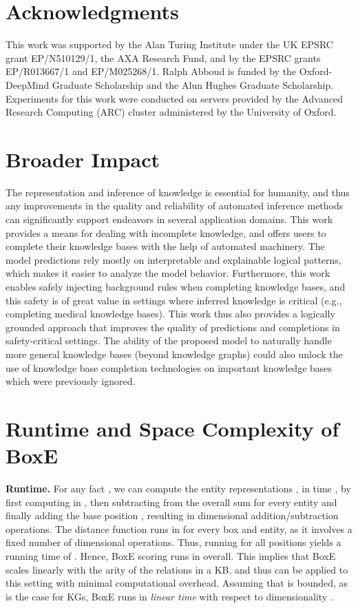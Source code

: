 \documentclass{article}
\begin{document}
\section*{Acknowledgments}
This work was supported by the Alan Turing Institute under the UK EPSRC grant EP/N510129/1, the AXA Research Fund, and by the EPSRC grants EP/R013667/1 and EP/M025268/1. Ralph Abboud is funded by the Oxford-DeepMind Graduate Scholarship and the Alun Hughes Graduate Scholarship. Experiments for this work were conducted on servers provided by the Advanced Research Computing (ARC) cluster administered by the University of Oxford. 


\section*{Broader Impact}
The representation and inference of knowledge is essential for humanity, and thus any improvements in the quality and reliability of automated inference methods can significantly support endeavors in several application domains. 
This work provides a means for dealing with incomplete knowledge, and offers users to complete their knowledge bases with the help of automated machinery. The model predictions rely mostly on interpretable and explainable logical patterns, which makes it easier to analyze the model behavior.
Furthermore, this work enables safely injecting background rules when completing knowledge bases, and this safety is of great value in settings where inferred knowledge is critical (e.g., completing medical knowledge bases). This work thus also provides a logically grounded approach that improves the quality of predictions and completions in safety-critical settings. The ability of the proposed model to naturally handle more general knowledge bases (beyond knowledge graphs) could also unlock the use of knowledge base completion technologies on important knowledge bases which were previously ignored.




\clearpage{}\appendix
\section{Runtime and Space Complexity of BoxE}
\label{app:complexity}
\textbf{Runtime.} 
For any fact , we can compute the entity representations ,  in time , by first computing  in , then subtracting  from the overall sum for every entity  and finally adding the base position , resulting in  dimensional addition/subtraction operations. The distance function  runs in  for every box and entity, as it involves a fixed number of dimensional operations. Thus, running  for all  positions yields a running time of . Hence, BoxE scoring runs in  overall. This implies that BoxE scales linearly with the arity of the relations in a KB, and thus can be applied to this setting with minimal computational overhead. Assuming that  is bounded, as is the case for KGs, BoxE runs in \emph{linear time} with respect to dimensionality .
\end{document}
